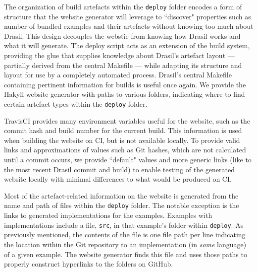 {{{{{The organization of build artefacts within the \texttt{deploy} folder encodes a form of structure that the website generator will leverage to ``discover" properties such as number of bundled examples and their artefacts without knowing too much about Drasil. This design decouples the webstie from knowing how Drasil works and what it will generate. The deploy script acts as an extension of the build system, providing the glue that supplies knowledge about Drasil's artefact layout --- partially derived from the central Makefile --- while adapting its structure and layout for use by a completely automated process. Drasil's central Makefile containing pertinent information for builds is useful once again. We provide the Hakyll website generator with paths to various folders, indicating where to find certain artefact types within the \texttt{deploy} folder. 

TravisCI provides many environment variables useful for the website, such as the commit hash and build number for the current build. This information is used when building the website on CI, but is not available locally. To provide valid links and approximations of values such as Git hashes, which are not calculated until a commit occurs, we provide ``default" values and more generic links (like to the most recent Drasil commit and build) to enable testing of the generated website locally with minimal differences to what would be produced on CI. 

Most of the artefact-related information on the website is generated from the name and path of files within the \texttt{deploy} folder. The notable exception is the links to generated implementations for the examples. Examples with implementations include a file, \texttt{src}, in that example's folder within \texttt{deploy}. As previously mentioned, the contents of the file is one file path per line indicating the location within the Git repository to an implementation (in \textit{some} language) of a given example. The website generator finds this file and uses those paths to properly construct hyperlinks to the folders on GitHub.

}}}}}
